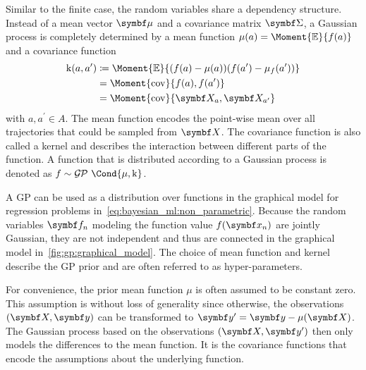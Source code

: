 Similar to the finite case, the random variables share a dependency structure.
Instead of a mean vector $\mat{\mu}$ and a covariance matrix $\mat{\Sigma}$, a Gaussian process is completely determined by a mean function $\mu(a) = \Moment{\E}{f(a)}$ and a covariance function
\begin{equation}
    \begin{split}
        \K(a, a^\prime) &\coloneqq \Moment{\E}{(f(a) - \mu(a))(f(a^\prime) - \mu_f(a^\prime))} \\
        &= \Moment{\cov}{f(a), f(a^\prime)} \\
        &= \Moment{\cov}{\rv{X}_a, \rv{X}_{a^\prime}}
    \end{split}
\end{equation}
with $a, a^\prime \in A$.
The mean function encodes the point-wise mean over all trajectories that could be sampled from $\rv{X}$.
The covariance function is also called a kernel and describes the interaction between different parts of the function.
A function that is distributed according to a Gaussian process is denoted as $f \sim \GP\Cond{\mu, \K}$.

A GP can be used as a distribution over functions in the graphical model for regression problems in~\cref{eq:bayesian_ml:non_parametric}.
Because the random variables $\mat{f}_n$ modeling the function value $f(\mat{x}_n)$ are jointly Gaussian, they are not independent and thus are connected in the graphical model in~\cref{fig:gp:graphical_model}.
The choice of mean function
and kernel
describe the GP prior and are often referred to as hyper-parameters.

For convenience, the prior mean function $\mu$ is often assumed to be constant zero.
This assumption is without loss of generality \cite{rasmussen_gaussian_2006} since otherwise, the observations $\left( \mat{X}, \mat{y} \right)$ can be transformed to $\mat{y^\prime} = \mat{y} - \mu(\mat{X})$.
The Gaussian process based on the observations $\left( \mat{X}, \mat{y^\prime} \right)$ then only models the differences to the mean function.
It is the covariance functions that encode the assumptions about the underlying function.

